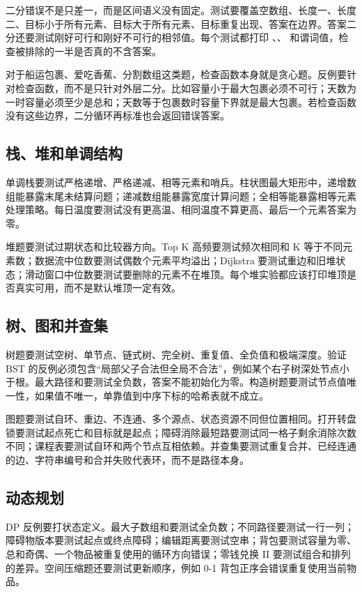 二分错误不是只差一，而是区间语义没有固定。测试要覆盖空数组、长度一、长度二、目标小于所有元素、目标大于所有元素、目标重复出现、答案在边界。答案二分还要测试刚好可行和刚好不可行的相邻值。每个测试都打印 、、 和谓词值，检查被排除的一半是否真的不含答案。

对于船运包裹、爱吃香蕉、分割数组这类题，检查函数本身就是贪心题。反例要针对检查函数，而不是只针对外层二分。比如容量小于最大包裹必须不可行；天数为一时容量必须至少是总和；天数等于包裹数时容量下界就是最大包裹。若检查函数没有这些边界，二分循环再标准也会返回错误答案。

\subsection{栈、堆和单调结构}

单调栈要测试严格递增、严格递减、相等元素和哨兵。柱状图最大矩形中，递增数组能暴露末尾未结算问题；递减数组能暴露宽度计算问题；全相等能暴露相等元素处理策略。每日温度要测试没有更高温、相同温度不算更高、最后一个元素答案为零。

堆题要测试过期状态和比较器方向。Top K 高频要测试频次相同和 K 等于不同元素数；数据流中位数要测试偶数个元素平均溢出；Dijkstra 要测试重边和旧堆状态；滑动窗口中位数要测试要删除的元素不在堆顶。每个堆实验都应该打印堆顶是否真实可用，而不是默认堆顶一定有效。

\subsection{树、图和并查集}

树题要测试空树、单节点、链式树、完全树、重复值、全负值和极端深度。验证 BST 的反例必须包含“局部父子合法但全局不合法”，例如某个右子树深处节点小于根。最大路径和要测试全负数，答案不能初始化为零。构造树题要测试节点值唯一性，如果值不唯一，单靠值到中序下标的哈希表就不成立。

图题要测试自环、重边、不连通、多个源点、状态资源不同但位置相同。打开转盘锁要测试起点死亡和目标就是起点；障碍消除最短路要测试同一格子剩余消除次数不同；课程表要测试自环和两个节点互相依赖。并查集要测试重复合并、已经连通的边、字符串编号和合并失败代表环，而不是路径本身。

\subsection{动态规划}

DP 反例要打状态定义。最大子数组和要测试全负数；不同路径要测试一行一列；障碍物版本要测试起点或终点障碍；编辑距离要测试空串；背包要测试容量为零、总和奇偶、一个物品被重复使用的循环方向错误；零钱兑换 II 要测试组合和排列的差异。空间压缩题还要测试更新顺序，例如 0-1 背包正序会错误重复使用当前物品。

